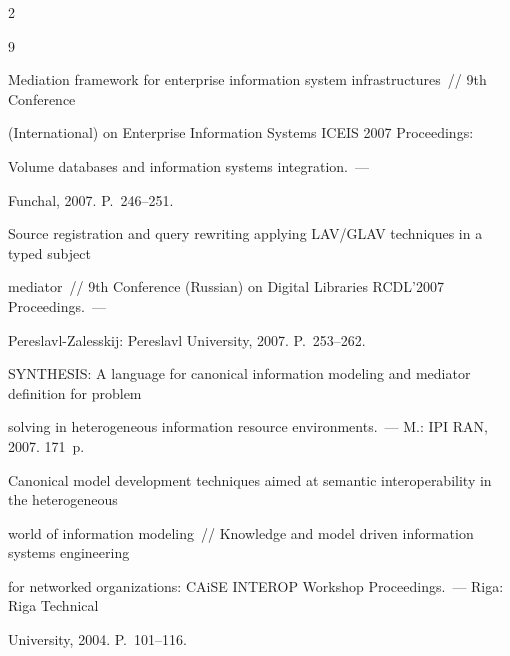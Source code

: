 \begin{multicols}{2}
{{\begin{thebibliography}{9}


Mediation framework for enterprise information system infrastructures~// 9th Conference 

(International) on Enterprise Information Systems ICEIS 2007 Proceedings:

Volume databases and information systems integration.~---

Funchal, 2007.  P.~246--251.





Source registration and query rewriting applying LAV/GLAV techniques in a typed subject 

mediator~// 9th Conference (Russian) on Digital Libraries RCDL'2007 Proceedings.~--- 

Pereslavl-Zalesskij: Pereslavl University, 2007. P.~253--262.





SYNTHESIS: A language for canonical information modeling and mediator definition for problem 

solving in heterogeneous information resource environments.~--- M.: IPI RAN, 2007. 171~p.





Canonical model development techniques aimed at semantic interoperability in the heterogeneous 

world of information modeling~// Knowledge and model driven information systems engineering 

for networked organizations: CAiSE INTEROP Workshop Proceedings.~--- Riga: Riga Technical 

University, 2004.  P.~101--116.








\end{thebibliography}}}
\end{multicols}
